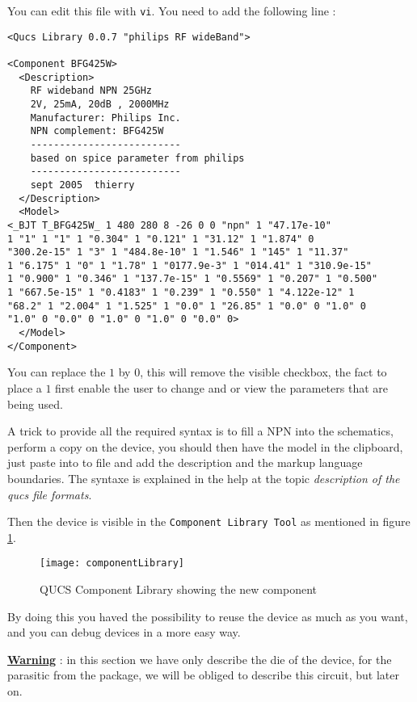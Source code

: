 You can edit this file with \texttt{vi}. You need to add the following line :
\begin{verbatim}
<Qucs Library 0.0.7 "philips RF wideBand">

<Component BFG425W>
  <Description>
    RF wideband NPN 25GHz 
    2V, 25mA, 20dB , 2000MHz
    Manufacturer: Philips Inc.
    NPN complement: BFG425W
    --------------------------
    based on spice parameter from philips
    --------------------------
    sept 2005  thierry
  </Description>
  <Model>
<_BJT T_BFG425W_ 1 480 280 8 -26 0 0 "npn" 1 "47.17e-10" 
1 "1" 1 "1" 1 "0.304" 1 "0.121" 1 "31.12" 1 "1.874" 0 
"300.2e-15" 1 "3" 1 "484.8e-10" 1 "1.546" 1 "145" 1 "11.37"
1 "6.175" 1 "0" 1 "1.78" 1 "0177.9e-3" 1 "014.41" 1 "310.9e-15"
1 "0.900" 1 "0.346" 1 "137.7e-15" 1 "0.5569" 1 "0.207" 1 "0.500"
1 "667.5e-15" 1 "0.4183" 1 "0.239" 1 "0.550" 1 "4.122e-12" 1
"68.2" 1 "2.004" 1 "1.525" 1 "0.0" 1 "26.85" 1 "0.0" 0 "1.0" 0 
"1.0" 0 "0.0" 0 "1.0" 0 "1.0" 0 "0.0" 0>
  </Model>
</Component>
\end{verbatim}

You can replace the $1$ by $0$, this will remove the visible checkbox, the fact to place a $1$ first enable the user to change and or view the parameters that are being used.

A trick to provide all the required syntax is to fill a NPN into the schematics, perform a copy on the device, you should then have the model in the clipboard, just paste into to file and add the description and the markup language boundaries. The syntaxe is explained in the help at the topic \textit{description of the qucs file formats}.


Then the device is visible in the \texttt{Component Library Tool} as mentioned in figure \ref{design:pa:componentTool}.

\begin{figure}[htbp]
\begin{center}
	\texttt{[image: componentLibrary]}
	\caption{QUCS Component Library showing the new component}
	\label{design:pa:componentTool}
\end{center}
\end{figure}


By doing this you haved the possibility to reuse the device as much as you want, and you can debug devices in a more easy way.

\underline{\textbf{Warning}} : in this section we have only describe the die of the device, for the parasitic from the package, we will be obliged to describe this circuit, but later on.

